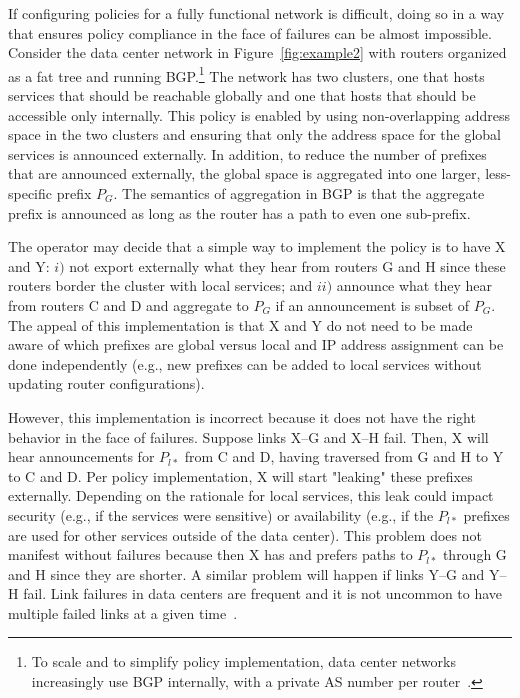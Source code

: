 If configuring policies for a fully functional network is difficult, doing so in a way that ensures policy compliance in the face of failures can be almost impossible. Consider the data center network in Figure~\ref{fig:example2} with routers organized as a fat tree and running BGP.\footnote{To scale and to simplify policy implementation, data center networks increasingly use BGP internally, with a private AS number per router~\cite{bgp-in-dc-rfc}.} The network has two clusters, one that hosts services that should be reachable globally and one that hosts that should be accessible only internally. This policy is enabled by using non-overlapping address space in the two clusters and ensuring that only the address space for the global services is announced externally. In addition, to reduce the number of prefixes that are announced externally, the global space is aggregated into one larger, less-specific prefix $P_G$. The semantics of aggregation in BGP is that the aggregate prefix is announced as long as the router has a path to even one sub-prefix.

The operator may decide that a simple way to implement the policy is to have X and Y: $i)$ not export externally what they hear from routers G and H since these routers border the cluster with local services; and $ii)$ announce what they hear from routers C and D and aggregate to $P_G$ if an announcement is subset of $P_G$. The appeal of this implementation is that X and Y do not need to be made aware of which prefixes are global versus local and IP address assignment can be done independently (e.g., new prefixes can be added to local services without updating router configurations).

However, this implementation is incorrect because it does not have the right behavior in the face of failures. Suppose links X--G and X--H fail. Then, X will hear announcements for $P_{l*}$ from C and D, having traversed from G and H to Y to C and D. Per policy implementation, X will start "leaking" these prefixes externally. Depending on the rationale for local services, this leak could impact security (e.g., if the services were sensitive) or availability (e.g., if the $P_{l*}$ prefixes are used for other services outside of the data center). This problem does not manifest without failures because then X has and prefers paths to $P_{l*}$ through G and H since they are shorter. A similar problem will happen if links Y--G and Y--H fail.
Link failures in data centers are frequent and it is not uncommon to have multiple failed links at a given time~\cite{dc-failure-study}.

